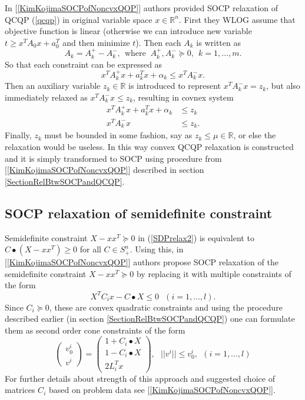 \documentclass[10pt,oneside]{book}
\theoremstyle{definition}
\begin{document}
In [\ref{KimKojimaSOCPofNoncvxQOP}] authors provided SOCP relaxation of QCQP (\ref{qcqp}) in original variable space $x\in \mathbb{R}^n$. First they WLOG assume that objective function is linear (otherwise we can introduce new variable $t\geq x^TA_0x + a_0^T$ and then minimize $t$). Then each $A_k$ is written as 
$$A_k=A_k^+ -A_k^-, \ \ \mbox{where } \ A_k^+, A_k^- \succeq 0, \ \ k=1,\dots ,m.$$ 
So that each constraint can be expressed as 
$$x^TA_k^+x + a_k^Tx + \alpha_k \leq x^TA_k^-x.$$
Then an auxiliary variable $z_k\in \mathbb{R}$ is introduced to represent $x^TA_k^-x = z_k$, but also immediately relaxed as $x^TA_k^-x \leq z_k$, resulting in covnex system
\begin{equation}
\begin{array}{rl}
x^TA_k^+x + a_k^Tx + \alpha_k &\leq z_k  \\
x^TA_k^-x & \leq z_k.
\end{array} 
\end{equation}
Finally, $z_k$ must be bounded in some fashion, say as $z_k\leq \mu \in \mathbb{R}$, or else the relaxation would be useless. In this way convex QCQP relaxation is constructed and it is simply transformed to SOCP using procedure from [\ref{KimKojimaSOCPofNoncvxQOP}] described in section \ref{SectionRelBtwSOCPandQCQP}.

\subsection{SOCP relaxation of semidefinite constraint}

Semidefinite constraint $X-xx^T\succeq 0$  in (\ref{SDPrelax2}) is equivalent to $C\bullet(X-xx^T)\geq 0$ for all $C\in S^n_+$. Using this, in [\ref{KimKojimaSOCPofNoncvxQOP}] authors propose SOCP relaxation of the semidefinite constraint $X-xx^T\succeq 0$ by replacing it with multiple constraints of the form 
$$X^TC_ix-C\bullet X \leq 0 \ \ \ (i=1,\dots ,l).$$ 
Since $C_i\succeq 0$, these are convex quadratic constraints and using the procedure described earlier (in section \ref{SectionRelBtwSOCPandQCQP}) one can formulate them as second order cone constraints of the form
\begin{equation}
\label{SOCPRelaxOfPSDconstraint}
\left(\begin{array}{c}
v^i_0\\
v^i
\end{array}\right)
= \left(\begin{array}{c}
1+C_i\bullet X\\
1-C_i\bullet X \\
2L_i^Tx
\end{array}\right), \ \ \ ||v^i||\leq v^i_0, \ \ (i  = 1,\dots ,l)
\end{equation}
For further details about strength of this approach and suggested choice of matrices $C_i$ based on problem data see [\ref{KimKojimaSOCPofNoncvxQOP}].
\end{document}
